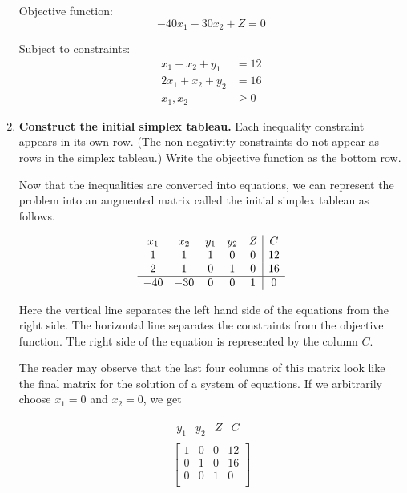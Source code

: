 \begin{solution}
\begin{enumerate}
              Objective function:
              \[ -40x_1 - 30x_2 + Z = 0 \]

              Subject to constraints:
              \begin{align*}
                  x_1 + x_2 + y_1  & = 12   \\
                  2x_1 + x_2 + y_2 & = 16   \\
                  x_1, x_2         & \geq 0
              \end{align*}


        \item \textbf{Construct the initial simplex tableau.}
              Each inequality constraint appears in its own row. (The non-negativity constraints do not appear as rows in the simplex tableau.) Write the objective function as the bottom row.

              Now that the inequalities are converted into equations, we can represent the problem into an augmented matrix called the initial simplex tableau as follows.

              \[
                  \begin{array}{c c c c c| c}

                      x_1 & x_2 & y_1 & y_2 & Z & C  \\

                      1   & 1   & 1   & 0   & 0 & 12 \\
                      2   & 1   & 0   & 1   & 0 & 16 \\
                      \hline
                      -40 & -30 & 0   & 0   & 1 & 0  \\
                  \end{array}
              \]

              Here the vertical line separates the left hand side of the equations from the right side. The horizontal line separates the constraints from the objective function. The right side of the equation is represented by the column \(C\).

              The reader may observe that the last four columns of this matrix look like the final matrix for the solution of a system of equations. If we arbitrarily choose \(x_1 = 0\) and \(x_2 = 0\), we get

              \[
                  \begin{array}{c}
                      \begin{array}{cccc}
                          y_1 & y_2 & Z & C
                      \end{array} \\
                      \left[
                          \begin{array}{ccc|c}
                              1 & 0 & 0 & 12 \\
                              0 & 1 & 0 & 16 \\
                              0 & 0 & 1 & 0  \\
                          \end{array}
                          \right]
                  \end{array}
              \]


\end{enumerate}
\end{solution}
